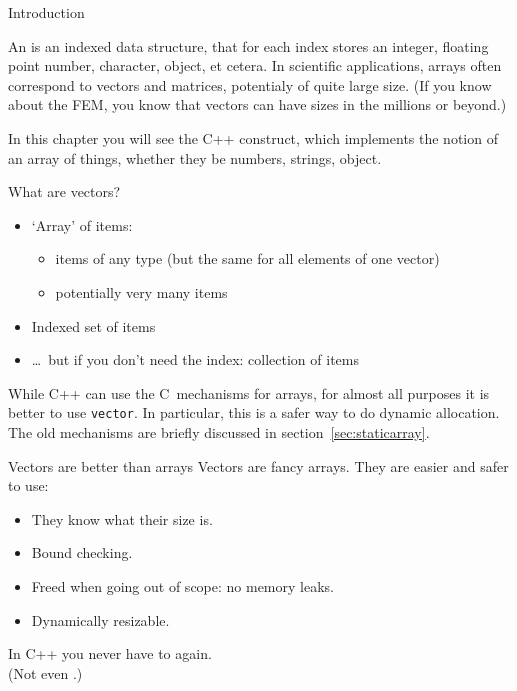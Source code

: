 
 {Introduction}

An  is an indexed data structure, that for each
index stores an integer, floating point number, character,
object, et cetera.
In scientific applications, arrays often correspond to vectors and
matrices, potentialy of quite large size. (If you know about the
\acf{FEM}, you know that vectors can have sizes in the millions or beyond.)

In this chapter you will see the C++  construct,
which implements the notion of an array of things, whether they be
numbers, strings, object.

\begin{slide}{What are vectors?}
  \label{sl:what-vector}
  \begin{itemize}
  \item `Array' of items:
    \begin{itemize}
    \item items of any type (but the same for all elements of one
      vector)
    \item potentially very many items
    \end{itemize}
  \item Indexed set of items
  \item \ldots~but if you don't need the index: collection of items
  \end{itemize}
\end{slide}

While C++ can use the C~mechanisms for arrays, for almost all purposes
it is better to use \lstinline{vector}. In particular, this is a safer way to
do dynamic allocation. The old
mechanisms are briefly discussed in section~\ref{sec:staticarray}.

\begin{slide}{Vectors are better than arrays}
  \label{sl:vector-why}
  Vectors are fancy arrays. They are easier and safer to use:
  \begin{itemize}
  \item They know what their size is.
  \item Bound checking.
  \item Freed when going out of scope: no memory leaks.
  \item Dynamically resizable.
  \end{itemize}
  In C++ you never have to  again.\\
  (Not even .)
\end{slide}

